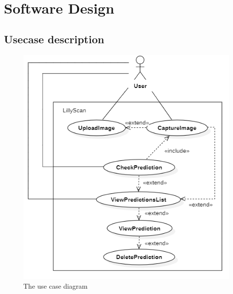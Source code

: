 \section{Software Design}

\subsection{Usecase description}

\begin{figure}[htbp]
	\centering
		\includegraphics[scale=0.6]{figures/usecase_diagram.png}
	\caption{The use case diagram}	        
\end{figure}

